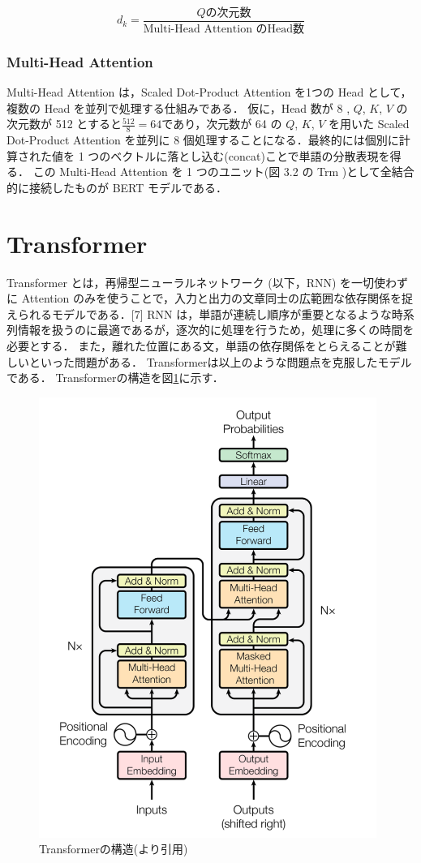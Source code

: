 \begin{equation}
    \label{dk}
    d_k = \frac{Q\text{の次元数}}{\text{Multi-Head Attention のHead数}}
\end{equation}

\subsubsection{Multi-Head Attention}
Multi-Head Attention は，Scaled Dot-Product Attention を1つの Head として，複数の Head を並列で処理する仕組みである．
仮に，Head 数が 8 , ${Q}$, ${K}$, ${V}$ の次元数が 512 とすると${\frac{512}{8}=64}$であり，次元数が 64 の ${Q}$, ${K}$, ${V}$ を用いた Scaled Dot-Product Attention を並列に 8 個処理することになる．最終的には個別に計算された値を 1 つのベクトルに落とし込む(concat)ことで単語の分散表現を得る．
この Multi-Head Attention を 1 つのユニット(図 3.2 の Trm )として全結合的に接続したものが BERT モデルである．

\section{Transformer \label{c4s4}}
Transformer とは，再帰型ニューラルネットワーク (以下，RNN) を一切使わずに Attention のみを使うことで，入力と出力の文章同士の広範囲な依存関係を捉えられるモデルである．[7]
RNN は，単語が連続し順序が重要となるような時系列情報を扱うのに最適であるが，逐次的に処理を行うため，処理に多くの時間を必要とする．
また，離れた位置にある文，単語の依存関係をとらえることが難しいといった問題がある．
Transformerは以上のような問題点を克服したモデルである．
Transformerの構造を図\ref{transformer}に示す．

\begin{figure}[H]%
	\centering
	\includegraphics[width=110mm]{image/transformer.png}
	\caption{Transformerの構造(\cite{attention}より引用)}
	\label{transformer}
\end{figure}

